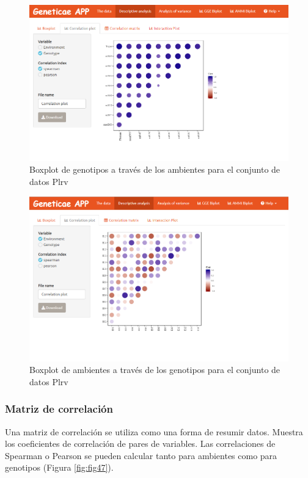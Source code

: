 \begin{figure}[H]
	\begin{center}
		\includegraphics[width=16cm]{./Graficos/corr_gen.png}
	\end{center}
	\caption{Boxplot de genotipos a través de los ambientes para el conjunto de datos Plrv}
	\label{fig:fig45}
\end{figure}


\begin{figure}[H]
	\begin{center}
		\includegraphics[width=17cm]{./Graficos/corr_withrep.png}
	\end{center}
	\caption{Boxplot de ambientes a través de los genotipos para el conjunto de datos Plrv}
	\label{fig:fig46}
\end{figure}

\subsubsection{Matriz de correlación}
Una matriz de correlación se utiliza como una forma de resumir datos. Muestra los coeficientes de correlación de pares de variables. Las correlaciones de Spearman o Pearson se pueden calcular tanto para ambientes como para genotipos (Figura \ref{fig:fig47}).


